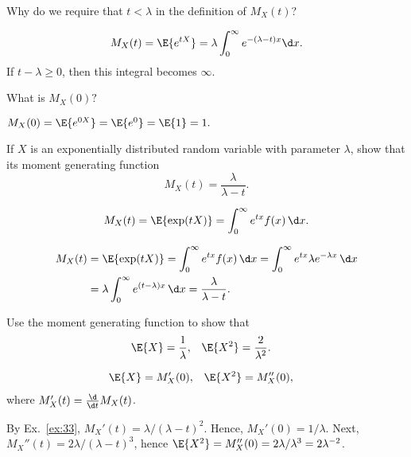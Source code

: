 \begin{exercise}
Why do we require that $t < \lambda$ in the definition of $M_X(t)$?
\begin{solution}
\begin{equation*}
  M_X(t) = \E{e^{t X}} = \lambda \int_0^\infty e^{-(\lambda-t) x}\d x.
\end{equation*}
  If $t - \lambda \geq 0$, then this integral becomes $\infty$. 
\end{solution}
\end{exercise}

\begin{exercise}
  What is $M_X(0)?$
  \begin{solution}
    $M_X(0) = \E{e^{0 X}} = \E{e^0} = \E{1} = 1.$
  \end{solution}
\end{exercise}

\begin{exercise}\label{ex:33}
 If $X$ is an exponentially distributed random variable with
    parameter $\lambda$, show that its moment generating function
    \begin{equation*}
    M_X(t) = \frac{\lambda}{\lambda-t}.
    \end{equation*}
   \begin{hint}
    \begin{equation*}
      M_X(t) = \E{\exp(t X)} =\int_0^\infty e^{t x} f(x) \,\d x.
\end{equation*}
\end{hint}
    \begin{solution}
    \begin{align*}
      M_X(t) &= \E{\exp(t X)}  
=\int_0^\infty e^{tx} f(x) \,\d x 
=\int_0^\infty e^{tx} \lambda e^{-\lambda x} \,\d x  \\
&=\lambda \int_0^\infty e^{(t-\lambda)x} \,\d x 
=\frac{\lambda}{\lambda -t}.
    \end{align*}
    \end{solution}
  \end{exercise}

\begin{exercise}\label{ex:21}
    Use the moment generating function to show that 
    \begin{align*}
      \E{X} &=\frac1\lambda, & 
      \E{X^2} &=\frac2{\lambda^2}.
    \end{align*}
\begin{hint}
    \begin{align*}
      \E{X} &= M_X'(0), &  \E{X^2} &= M_X''(0),
    \end{align*}
where $M_X'(t) = \frac{\d}{\d t} M_X(t)$. 
\end{hint}
\begin{solution} By Ex.~\ref{ex:33}, 
  $ M_X'(t)=\lambda/(\lambda-t)^2$. Hence, $M_X'(0)=1/\lambda$. Next, $M_X''(t)=2\lambda/(\lambda-t)^3$, hence $\E{X^2}=M_X''(0)=2\lambda/\lambda^3=2\lambda^{-2}$. 
\end{solution}
  \end{exercise}

